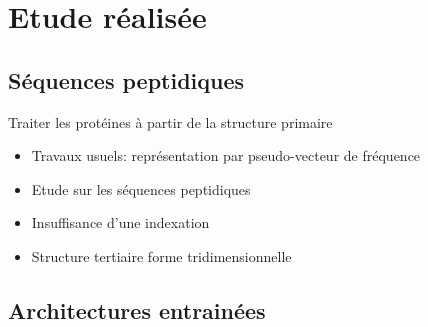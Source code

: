 \documentclass{beamer}
\begin{document}
\section{Etude réalisée}

\subsection{Séquences peptidiques}

\begin{frame}{Traiter les protéines à partir de la structure primaire}

    \begin{itemize}
    \item Travaux usuels: représentation par pseudo-vecteur de fréquence\pause
    \item Etude sur les séquences peptidiques\pause
    \item Insuffisance d'une indexation\pause
    \item Structure tertiaire forme tridimensionnelle \pause
    \end{itemize}
\end{frame}

\subsection{Architectures entrainées}
\end{document}

